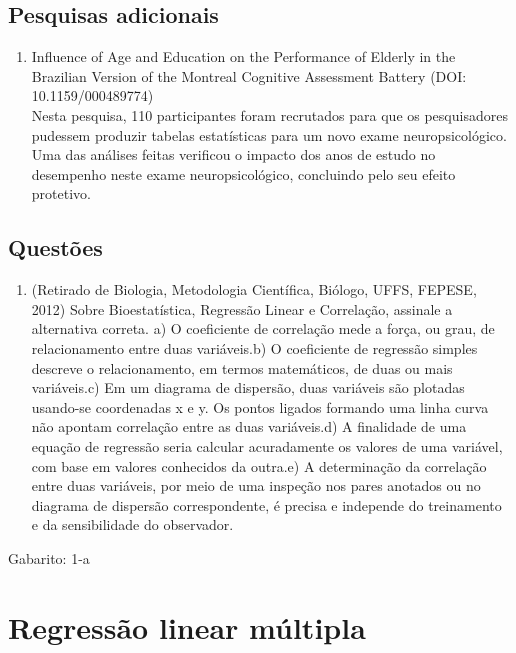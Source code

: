 \documentclass[
]{book}
\providecommand{\tightlist}{%
  \setlength{\itemsep}{0pt}\setlength{\parskip}{0pt}}
\begin{document}
\hypertarget{pesquisas-adicionais-8}{%
\section{Pesquisas adicionais}\label{pesquisas-adicionais-8}}

\begin{enumerate}
\def\labelenumi{\arabic{enumi}.}
\tightlist
\item
  Influence of Age and Education on the Performance of Elderly in the Brazilian Version of the Montreal Cognitive Assessment Battery (DOI: 10.1159/000489774)\\
  Nesta pesquisa, 110 participantes foram recrutados para que os pesquisadores pudessem produzir tabelas estatísticas para um novo exame neuropsicológico. Uma das análises feitas verificou o impacto dos anos de estudo no desempenho neste exame neuropsicológico, concluindo pelo seu efeito protetivo.
\end{enumerate}

\hypertarget{questuxf5es-8}{%
\section{Questões}\label{questuxf5es-8}}

\begin{enumerate}
\def\labelenumi{\arabic{enumi}.}
\tightlist
\item
  (Retirado de Biologia, Metodologia Científica, Biólogo, UFFS, FEPESE, 2012) Sobre Bioestatística, Regressão Linear e Correlação, assinale a alternativa correta. a) O coeficiente de correlação mede a força, ou grau, de relacionamento entre duas variáveis.b) O coeficiente de regressão simples descreve o relacionamento, em termos matemáticos, de duas ou mais variáveis.c) Em um diagrama de dispersão, duas variáveis são plotadas usando-se coordenadas x e y. Os pontos ligados formando uma linha curva não apontam correlação entre as duas variáveis.d) A finalidade de uma equação de regressão seria calcular acuradamente os valores de uma variável, com base em valores conhecidos da outra.e) A determinação da correlação entre duas variáveis, por meio de uma inspeção nos pares anotados ou no diagrama de dispersão correspondente, é precisa e independe do treinamento e da sensibilidade do observador.
\end{enumerate}

Gabarito: 1-a

\hypertarget{regressuxe3o-linear-muxfaltipla}{%
\chapter{Regressão linear múltipla}\label{regressuxe3o-linear-muxfaltipla}}
\end{document}
